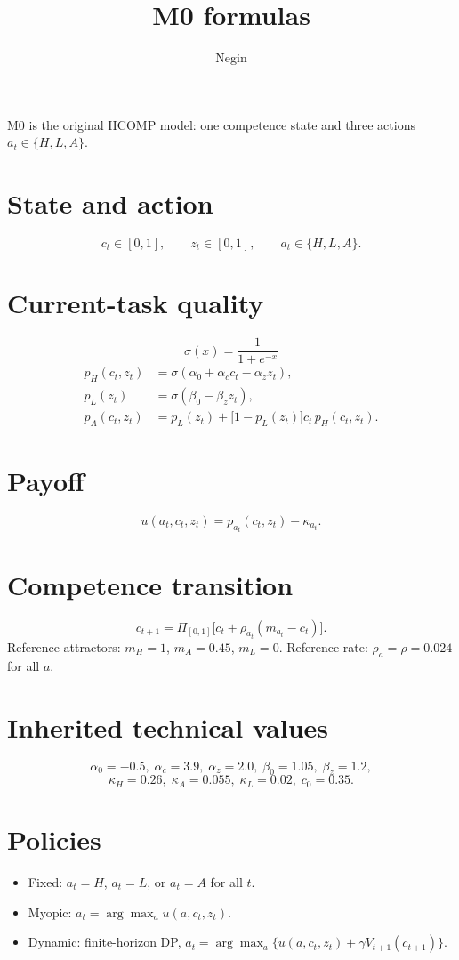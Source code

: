 \documentclass[11pt]{article}
\title{M0 formulas}
\author{Negin}
\date{}
\begin{document}
\maketitle

\noindent
M0 is the original HCOMP model: one competence state and three actions
\(a_t\in\{H,L,A\}\).

\section*{State and action}
\[
c_t\in[0,1],\qquad z_t\in[0,1],\qquad a_t\in\{H,L,A\}.
\]

\section*{Current-task quality}
\[
\sigma(x)=\frac{1}{1+e^{-x}}
\]
\begin{align}
p_H(c_t,z_t)
&=\sigma(\alpha_0+\alpha_c c_t-\alpha_z z_t),\\
p_L(z_t)
&=\sigma(\beta_0-\beta_z z_t),\\
p_A(c_t,z_t)
&=p_L(z_t)+\bigl[1-p_L(z_t)\bigr]c_t\,p_H(c_t,z_t).
\end{align}

\section*{Payoff}
\[
u(a_t,c_t,z_t)=p_{a_t}(c_t,z_t)-\kappa_{a_t}.
\]

\section*{Competence transition}
\[
c_{t+1}
=\Pi_{[0,1]}\bigl[c_t+\rho_{a_t}(m_{a_t}-c_t)\bigr].
\]
Reference attractors: \(m_H=1\), \(m_A=0.45\), \(m_L=0\).
Reference rate: \(\rho_a=\rho=0.024\) for all \(a\).

\section*{Inherited technical values}
\[
\alpha_0=-0.5,\;
\alpha_c=3.9,\;
\alpha_z=2.0,\;
\beta_0=1.05,\;
\beta_z=1.2,
\]
\[
\kappa_H=0.26,\;
\kappa_A=0.055,\;
\kappa_L=0.02,\;
c_0=0.35.
\]

\section*{Policies}
\begin{itemize}
  \item Fixed: \(a_t=H\), \(a_t=L\), or \(a_t=A\) for all \(t\).
  \item Myopic: \(a_t=\arg\max_a u(a,c_t,z_t)\).
  \item Dynamic: finite-horizon DP,
  \(a_t=\arg\max_a\bigl\{u(a,c_t,z_t)+\gamma V_{t+1}(c_{t+1})\bigr\}\).
\end{itemize}
\end{document}
